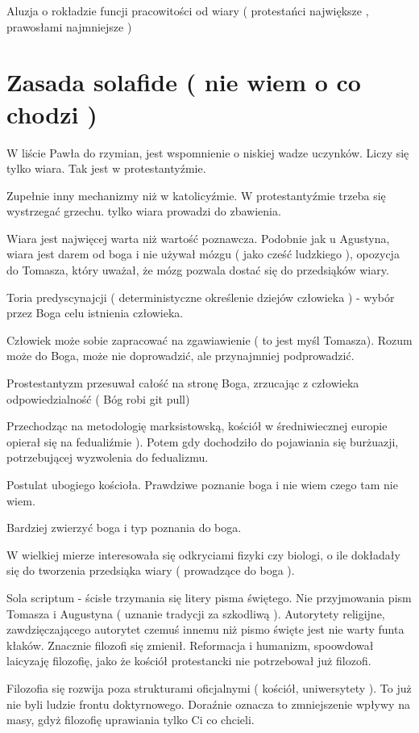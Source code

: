 \documentclass[11pt]{article}
\begin{document}
Aluzja o rokładzie funcji pracowitości od wiary ( protestańci największe , prawosłami najmniejsze )

\section{Zasada solafide ( nie wiem o co chodzi )}
W liście Pawła do rzymian, jest wspomnienie o niskiej wadze uczynków. Liczy się tylko wiara. Tak jest w protestantyźmie.

Zupełnie inny mechanizmy niż w katolicyźmie. W protestantyźmie trzeba się wystrzegać grzechu. tylko wiara prowadzi do zbawienia. 

Wiara jest najwięcej warta niż wartość poznawcza. Podobnie jak u Agustyna, wiara jest darem od boga i nie używał mózgu ( jako cześć ludzkiego ), opozycja do Tomasza, który uważał, że mózg pozwala dostać się do przedsiąków wiary.

Toria predyscynajcji ( deterministyczne określenie dziejów człowieka ) - wybór przez Boga celu istnienia człowieka.

Człowiek może sobie zapracować na zgawiawienie ( to jest myśl Tomasza). Rozum może do Boga, może nie doprowadzić, ale przynajmniej podprowadzić.

Prostestantyzm przesuwał całość na stronę Boga, zrzucając z człowieka odpowiedzialność ( Bóg robi git pull)

Przechodząc na metodologię marksistowską, kościół w średniwiecznej europie opierał się na fedualiźmie ). Potem gdy dochodziło do pojawiania się burżuazji, potrzebującej wyzwolenia do fedualizmu.

Postulat ubogiego kościoła.
Prawdziwe poznanie boga i nie wiem czego tam nie wiem.

Bardziej zwierzyć boga i typ poznania do boga.

W wielkiej mierze interesowała się odkryciami fizyki czy biologi, o ile dokładały się do tworzenia przedsiąka wiary ( prowadzące do boga ).

Sola scriptum - ścisłe trzymania się litery pisma świętego. Nie przyjmowania pism Tomasza i Augustyna ( uznanie tradycji za szkodliwą ). Autorytety religijne, zawdzięczającego autorytet czemuś innemu niż pismo święte jest nie warty funta kłaków. Znacznie filozofi się zmienił. Reformacja i humanizm, spoowdował laicyzaję filozofię, jako że kościół protestancki nie potrzebował już filozofi.

Filozofia się rozwija poza strukturami oficjalnymi ( kościół, uniwersytety ). To już nie byli ludzie frontu doktyrnowego. Doraźnie oznacza to zmniejszenie wpływy na masy, gdyż filozofię uprawiania tylko Ci co chcieli.
\end{document}

